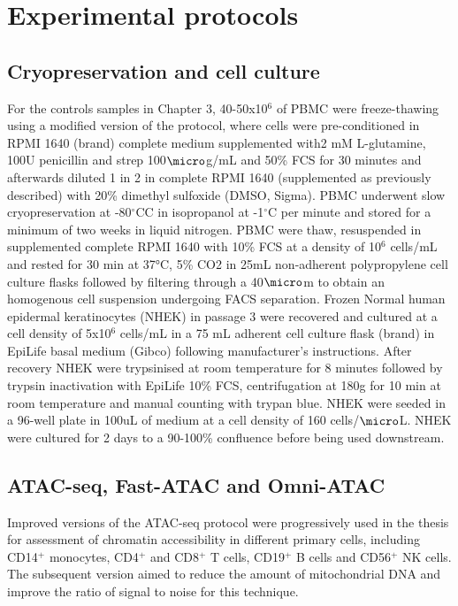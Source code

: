 \section{Experimental protocols}
\subsection{Cryopreservation and cell culture}
For the controls samples in Chapter 3, 40-50x10$^6$ of PBMC were freeze-thawing using a modified version of the \parencite{Kent2009} protocol, where cells were pre-conditioned in RPMI 1640 (brand) complete medium supplemented with2 mM L-glutamine, 100U penicillin and strep 100$\micro$g/mL and 50\% FCS for 30 minutes and afterwards diluted 1 in 2 in complete RPMI 1640 (supplemented as previously described) with 20\% dimethyl sulfoxide (DMSO, Sigma). PBMC underwent slow cryopreservation at -80{$^\circ$}CC in isopropanol at -1{$^\circ$}C per minute and stored for a minimum of two weeks in liquid nitrogen. PBMC were thaw, resuspended in supplemented complete RPMI 1640 with 10\% FCS at a density of 10$^6$ cells/mL and rested for 30 min at 37°C, 5\% CO2 in 25mL non-adherent polypropylene cell culture flasks followed by filtering through a 40$\micro$m to obtain an homogenous cell suspension undergoing FACS separation.
%
Frozen Normal human epidermal keratinocytes (NHEK) in passage 3 were recovered and cultured at a cell density of 5x10$^6$ cells/mL in a 75 mL adherent cell culture flask (brand) in EpiLife basal medium (Gibco) following manufacturer's instructions. After recovery NHEK were trypsinised at room temperature for 8 minutes followed by trypsin inactivation with EpiLife 10\% FCS, centrifugation at 180g for 10 min at room temperature and manual counting with trypan blue. NHEK were seeded in a 96-well plate in 100uL of medium at a cell density of 160 cells/$\micro$L. NHEK were cultured for 2 days to a 90-100\% confluence before being used downstream.

\subsection{ATAC-seq, Fast-ATAC and Omni-ATAC}
Improved versions of the ATAC-seq protocol were progressively used in the thesis for assessment of chromatin accessibility in different primary cells, including CD14$^{+}$ monocytes, CD4$^+$ and CD8$^+$ T cells, CD19$^+$ B cells and CD56$^+$ NK cells. The subsequent version aimed to reduce the amount of mitochondrial DNA and improve the ratio of signal to noise for this technique.

